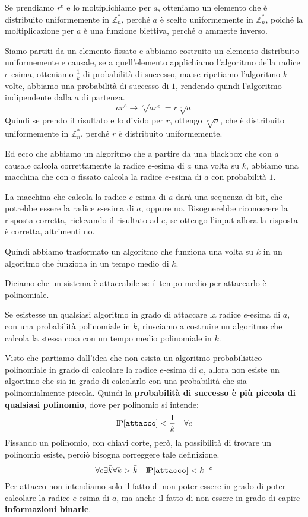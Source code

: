 Se prendiamo $r^e$ e lo moltiplichiamo per $a$, otteniamo un elemento che è distribuito
uniformemente in $\mathbb{Z}_n^*$, perché $a$ è scelto uniformemente in $\mathbb{Z}_n^*$, 
poiché la moltiplicazione per $a$ è una funzione biettiva, perché $a$ ammette inverso.

Siamo partiti da un elemento fissato e abbiamo costruito un elemento distribuito uniformemente
e causale, se a quell'elemento applichiamo l'algoritmo della radice $e$-esima, otteniamo
$\frac{1}{k}$ di probabilità di successo, ma se ripetiamo l'algoritmo $k$ volte, abbiamo
una probabilità di successo di $1$, rendendo quindi l'algoritmo indipendente dalla $a$ di 
partenza.
\[
  ar^e \rightarrow \sqrt[e]{ar^e} = r \sqrt[e]{a}
\]
Quindi se prendo il risultato e lo divido per $r$, ottengo $\sqrt[e]{a}$,
che è distribuito uniformemente in $\mathbb{Z}_n^*$, perché $r$ è distribuito uniformemente.

Ed ecco che abbiamo un algoritmo che a partire da una blackbox che con $a$ causale 
calcola correttamente la radice $e$-esima di $a$ una volta su $k$, abbiamo una macchina 
che con $a$ fissato calcola la radice $e$-esima di $a$ con probabilità $1$.

La macchina che calcola la radice $e$-esima di $a$ darà una sequenza di bit, che
potrebbe essere la radice $e$-esima di $a$, oppure no. Bisognerebbe riconoscere la risposta
corretta, rielevando il risultato ad $e$, se ottengo l'input allora la risposta è 
corretta, altrimenti no.

Quindi abbiamo trasformato un algoritmo che funziona una volta su $k$ in un algoritmo
che funziona in un tempo medio di $k$.
\begin{tcolorbox}[title=Definizione di sicurezza]
  Diciamo che un sistema è attaccabile se il tempo medio per attaccarlo è polinomiale.
\end{tcolorbox}
Se esistesse un qualsiasi algoritmo in grado di attaccare la radice $e$-esima di $a$,
con una probabilità polinomiale in $k$, riusciamo a costruire un algoritmo che calcola
la stessa cosa con un tempo medio polinomiale in $k$.

Visto che partiamo  dall'idea che non esista un algoritmo probabilistico polinomiale 
in grado di calcolare la radice $e$-esima di $a$, allora non esiste un algoritmo
che sia in grado di calcolarlo con una probabilità che sia polinomialmente piccola.
Quindi la \textbf{probabilità di successo è più piccola di qualsiasi polinomio}, dove per polinomio 
si intende:
\[
  \text{I\kern-0.15em P}[\texttt{attacco}] < \frac{1}{k}\quad \forall c
\]
Fissando un polinomio, con chiavi corte, però, la possibilità di trovare un polinomio esiste, 
perciò bisogna correggere tale definizione.
\begin{equation}
  \forall c \exists \bar{k} \forall k > \bar{k}\quad\text{I\kern-0.15em P}[\texttt{attacco}] < k^{-c}
\end{equation}
Per attacco non intendiamo solo il fatto di non poter essere in grado di poter calcolare la 
radice $e$-esima di $a$, ma anche il fatto di non essere in grado di capire 
\textbf{informazioni binarie}.

